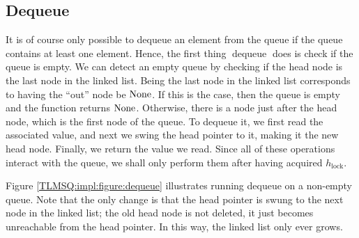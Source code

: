 \documentclass[a4paper, 10pt]{report}
\theoremstyle{definition}
\newcommand{\dequeue}{\operatorname{dequeue}}
\newcommand{\Hlock}{h_{\mathrm{lock}}}
\begin{document}
\subsection{Dequeue}
\label{TLMSQ:implementation:sub:dequeue}

It is of course only possible to dequeue an element from the queue if the queue contains at least one element. Hence, the first thing $\dequeue$ does is check if the queue is empty. We can detect an empty queue by checking if the head node is the last node in the linked list. Being the last node in the linked list corresponds to having the ``out'' node be $\operatorname{None}$. If this is the case, then the queue is empty and the function returns $\operatorname{None}$. Otherwise, there is a node just after the head node, which is the first node of the queue. To dequeue it, we first read the associated value, and next we swing the head pointer to it, making it the new head node. Finally, we return the value we read. Since all of these operations interact with the queue, we shall only perform them after having acquired $\Hlock$.

Figure \ref{TLMSQ:impl:figure:dequeue} illustrates running dequeue on a non-empty queue. Note that the only change is that the head pointer is swung to the next node in the linked list; the old head node is not deleted, it just becomes unreachable from the head pointer. In this way, the linked list only ever grows.
\end{document}
